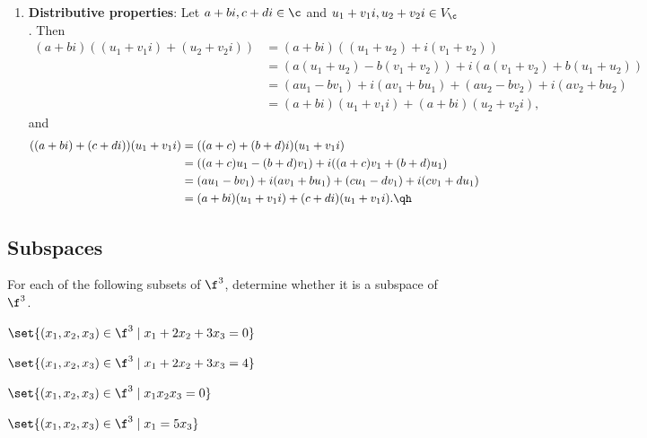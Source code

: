 \begin{sol}
\begin{enumerate}
        \item \textbf{Distributive properties}: Let $a + bi, c + di \in \c$ and $u_1 + v_1i, u_2 + v_2i \in V_{\c}$. Then
        \begin{align*}
            (a + bi)((u_1 + v_1i) + (u_2 + v_2i)) & = (a + bi)((u_1 + u_2) + i(v_1 + v_2)) \\
            & = (a(u_1 + u_2) - b(v_1 + v_2)) + i(a(v_1 + v_2) + b(u_1 + u_2)) \\
            & = (au_1 - bv_1) + i(av_1 + bu_1) + (au_2 - bv_2) + i(av_2 + bu_2) \\
            & = (a + bi)(u_1 + v_1i) + (a + bi)(u_2 + v_2i),
        \end{align*}
        and
        \begin{align*}
            ((a + bi) + (c + di))(u_1 + v_1i) & = ((a + c) + (b + d)i)(u_1 + v_1i) \\
            & = ((a + c)u_1 - (b + d)v_1) + i((a + c)v_1 + (b + d)u_1) \\
            & = (au_1 - bv_1) + i(av_1 + bu_1) + (cu_1 - dv_1) + i(cv_1 + du_1) \\
            & = (a + bi)(u_1 + v_1i) + (c + di)(u_1 + v_1i). \qh
        \end{align*}
    \end{enumerate}
\end{sol}

\newpage

\subsection{Subspaces}

\begin{exercise}[1c1]
    For each of the following subsets of $\f^3$, determine whether it is a subspace of $\f^3$.
    \begin{subexercises}
        \item $\set{(x_1, x_2, x_3) \in \f^3 \mid x_1 + 2x_2 + 3x_3 = 0}$
        \item $\set{(x_1, x_2, x_3) \in \f^3 \mid x_1 + 2x_2 + 3x_3 = 4}$
        \item $\set{(x_1, x_2, x_3) \in \f^3 \mid x_1x_2x_3 = 0}$
        \item $\set{(x_1, x_2, x_3) \in \f^3 \mid x_1 = 5x_3}$
    \end{subexercises}
\end{exercise}

